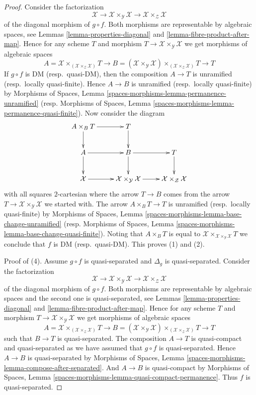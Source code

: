\documentclass[10pt,a4paper]{amsart}
\theoremstyle{plain}
\theoremstyle{definition}
\theoremstyle{remark}
\numberwithin{equation}{subsection}
\begin{document}
\begin{proof}
Consider the factorization
$$
\mathcal{X} \to
\mathcal{X} \times_\mathcal{Y} \mathcal{X} \to
\mathcal{X} \times_\mathcal{Z} \mathcal{X}
$$
of the diagonal morphism of $g \circ f$. Both morphisms are representable by
algebraic spaces, see
Lemmas \ref{lemma-properties-diagonal} and
\ref{lemma-fibre-product-after-map}.
Hence for any scheme $T$ and morphism
$T \to \mathcal{X} \times_\mathcal{Y} \mathcal{X}$
we get morphisms of algebraic spaces
$$
A = \mathcal{X} \times_{(\mathcal{X} \times_\mathcal{Z} \mathcal{X})} T
\longrightarrow
B = (\mathcal{X} \times_\mathcal{Y} \mathcal{X})
\times_{(\mathcal{X} \times_\mathcal{Z} \mathcal{X})} T
\longrightarrow
T
$$
If $g \circ f$ is DM (resp.\ quasi-DM), then the composition $A \to T$
is unramified (resp.\ locally quasi-finite). Hence $A \to B$ is
unramified (resp.\ locally quasi-finite) by
Morphisms of Spaces, Lemma
\ref{spaces-morphisms-lemma-permanence-unramified}
(resp.
Morphisms of Spaces,
Lemma \ref{spaces-morphisms-lemma-permanence-quasi-finite}).
Now consider the diagram
$$
\xymatrix{
A \times_B T \ar[r] \ar[d] & T \ar[d] \\
A \ar[r] \ar[d] & B \ar[r] \ar[d] & T \ar[d] \\
\mathcal{X} \ar[r] &
\mathcal{X} \times_\mathcal{Y} \mathcal{X} \ar[r] &
\mathcal{X} \times_\mathcal{Z} \mathcal{X}
}
$$
with all squares $2$-cartesian where the arrow $T \to B$ comes from the arrow
$T \to \mathcal{X} \times_\mathcal{Y} \mathcal{X}$ we started with.
The arrow $A \times_B T \to T$ is unramified (resp.\ locally quasi-finite)
by Morphisms of Spaces, Lemma
\ref{spaces-morphisms-lemma-base-change-unramified}
(resp.
Morphisms of Spaces,
Lemma \ref{spaces-morphisms-lemma-base-change-quasi-finite}).
Noting that $A \times_B T$ is equal to
$\mathcal{X} \times_{\mathcal{X} \times_\mathcal{Y} \mathcal{X}} T$
we conclude that $f$ is DM (resp.\ quasi-DM).
This proves (1) and (2).

\medskip\noindent
Proof of (4). Assume $g \circ f$ is quasi-separated and $\Delta_g$ is
quasi-separated. Consider the factorization
$$
\mathcal{X} \to
\mathcal{X} \times_\mathcal{Y} \mathcal{X} \to
\mathcal{X} \times_\mathcal{Z} \mathcal{X}
$$
of the diagonal morphism of $g \circ f$. Both morphisms are
representable by algebraic spaces and the second one is quasi-separated, see
Lemmas \ref{lemma-properties-diagonal} and
\ref{lemma-fibre-product-after-map}.
Hence for any scheme $T$ and morphism
$T \to \mathcal{X} \times_\mathcal{Y} \mathcal{X}$
we get morphisms of algebraic spaces
$$
A = \mathcal{X} \times_{(\mathcal{X} \times_\mathcal{Z} \mathcal{X})} T
\longrightarrow
B = (\mathcal{X} \times_\mathcal{Y} \mathcal{X})
\times_{(\mathcal{X} \times_\mathcal{Z} \mathcal{X})} T
\longrightarrow
T
$$
such that $B \to T$ is quasi-separated.
The composition $A \to T$ is quasi-compact and quasi-separated
as we have assumed that $g \circ f$ is quasi-separated.
Hence $A \to B$ is quasi-separated by
Morphisms of Spaces,
Lemma \ref{spaces-morphisms-lemma-compose-after-separated}.
And $A \to B$ is quasi-compact by
Morphisms of Spaces,
Lemma \ref{spaces-morphisms-lemma-quasi-compact-permanence}.
Thus $f$ is quasi-separated.


\end{proof}
\end{document}
